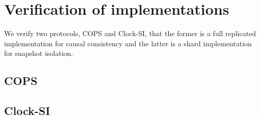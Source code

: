 \section{Verification of implementations}
\label{sec:implementation-verification}
\label{app:implementation-verification}
We verify two protocols, COPS and Clock-SI, that the former is a full replicated implementation for causal consistency and the latter is a shard implementation for snapshot isolation.
\subsection{COPS}
\label{sec:cops}

%
\subsection{Clock-SI}
\label{sec:clock-si}


